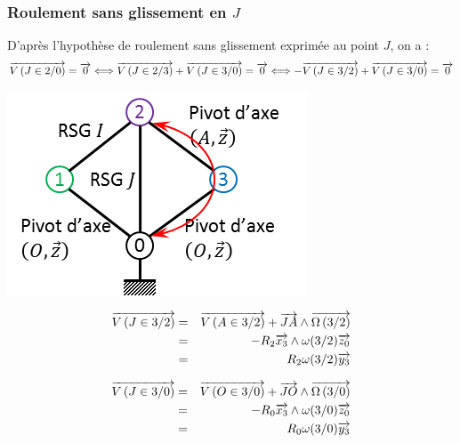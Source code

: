 \documentclass[10pt,oneside]{article}
\begin{document}
\subsubsection{Roulement sans glissement en $J$}
\begin{minipage}[c]{.6\linewidth}
D'après l'hypothèse de roulement sans glissement exprimée au point $J$, on a : 
$$
\overrightarrow{V\left( {J} \in {2}/{0}\right)} = \overrightarrow{0}
\Longleftrightarrow 
\overrightarrow{V\left( {J} \in {2}/{3}\right)} + \overrightarrow{V\left( {J} \in {3}/{0}\right)}= \overrightarrow{0}
\Longleftrightarrow 
-\overrightarrow{V\left( {J} \in {3}/{2}\right)} + \overrightarrow{V\left( {J} \in {3}/{0}\right)}= \overrightarrow{0}
$$
\end{minipage}\hfill
\begin{minipage}[c]{.3\linewidth}
\begin{center}
\includegraphics[width=.95\textwidth]{png/graphe_j}
\end{center}
\end{minipage}


\begin{minipage}[c]{.45\linewidth}
\begin{eqnarray*}
\overrightarrow{V\left( {J} \in {3}/{2}\right)} &=& \overrightarrow{V\left( {A} \in {3}/{2}\right)} + \overrightarrow{JA}\wedge\overrightarrow{\Omega\left( {3}/{2}\right)} \\
& = & -R_2\overrightarrow{x_3} \wedge \omega(3/2)\overrightarrow{z_0}\\
& = & R_2 \omega(3/2)\overrightarrow{y_3}
\end{eqnarray*}
\end{minipage}\hfill
\begin{minipage}[c]{.45\linewidth}
\begin{eqnarray*}
\overrightarrow{V\left( {J} \in {3}/{0}\right)} &=& \overrightarrow{V\left( {O} \in {3}/{0}\right)} + \overrightarrow{JO}\wedge\overrightarrow{\Omega\left( {3}/{0}\right)} \\
& = & -R_0\overrightarrow{x_3} \wedge \omega(3/0)\overrightarrow{z_0} \\
& = & R_0 \omega(3/0)\overrightarrow{y_3}
\end{eqnarray*}
\end{minipage}
\end{document}
